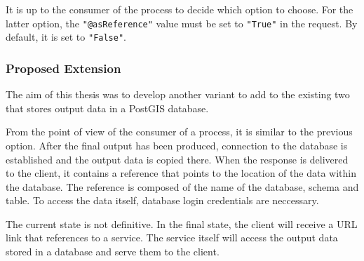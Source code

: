   It is up to the consumer of the process to decide which option to
  choose. For the latter option, the \texttt{"@asReference"} value
  must be set to \texttt{"True"} in the request. \cite{asref} By
  default, it is set to \texttt{"False"}.


\subsubsection{Proposed Extension} 

The aim of this thesis was to develop another variant to add to the
existing two that stores output data in a PostGIS database.

From the point of view of the consumer of a process, it is similar to
the previous option. After the final output has been produced,
connection to the database is established and the output data is
copied there. When the  response is delivered to the client,
it contains a reference that points to the location of the data 
within the database. The reference is composed of the name of the database, schema and table. To access the data itself, database login credentials are neccessary.

The current state is not definitive. In the final state, the client
will receive a URL link that references to a  service. The
 service itself will access the output data stored in a
database and serve them to the client.


